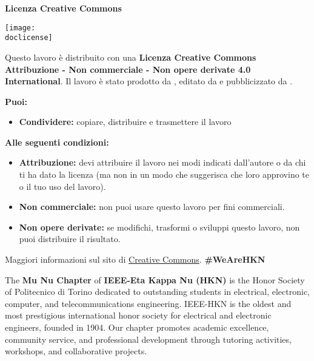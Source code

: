     \vfill

    \begin{center}
        \begin{minipage}{\linewidth}
            \begin{minipage}{0.6\textwidth}
                {\Large\textbf{Licenza Creative Commons}}
            \end{minipage}
            \begin{minipage}{0.39\linewidth}
                \raggedleft
                \texttt{[image: \\doclicense]}
            \end{minipage}
        \end{minipage}
    \end{center}

    Questo lavoro è distribuito con una \textbf{Licenza Creative Commons Attribuzione - Non commerciale - Non opere derivate 4.0 International}.
    Il lavoro è stato prodotto da \DDauthors\ifx\DDeditors\empty\else, editato da \DDeditors\fi{} e pubblicizzato da \DDorganization.

    \textbf{Puoi:}
    \begin{itemize}[topsep=0pt,itemsep=0pt,parsep=0pt,partopsep=0pt]
        \item \textbf{Condividere:} copiare, distribuire e trasmettere il lavoro
    \end{itemize}

    \textbf{Alle seguenti condizioni:}
    \begin{itemize}[topsep=0pt,itemsep=0pt,parsep=0pt,partopsep=0pt]
        \item \textbf{Attribuzione:} devi attribuire il lavoro nei modi indicati dall'autore o da chi ti ha dato la licenza (ma non in un modo che suggerisca che loro approvino te o il tuo uso del lavoro).
        \item \textbf{Non commerciale:} non puoi usare questo lavoro per fini commerciali.
        \item \textbf{Non opere derivate:} se modifichi, trasformi o sviluppi questo lavoro, non puoi distribuire il risultato.
    \end{itemize}

    Maggiori informazioni sul sito di \href{https://creativecommons.org/licenses/by-nc-nd/4.0/}{Creative Commons}.
\else
    {\Large\textbf{\#WeAreHKN}}
    \vspace{0.2cm}
    \par
    The \textbf{Mu Nu Chapter} of \textbf{IEEE-Eta Kappa Nu (HKN)} is the Honor Society of Politecnico di Torino dedicated to outstanding students in electrical, electronic, computer, and telecommunications engineering. IEEE-HKN is the oldest and most prestigious international honor society for electrical and electronic engineers, founded in 1904. Our chapter promotes academic excellence, community service, and professional development through tutoring activities, workshops, and collaborative projects.

